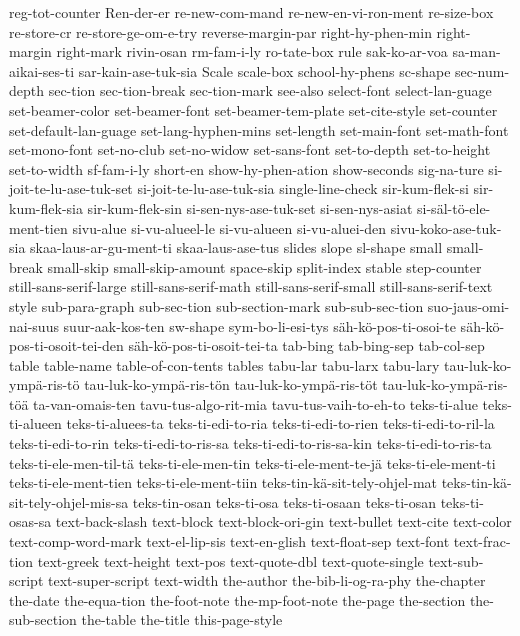 {reg-tot-counter
Ren-der-er
re-new-com-mand
re-new-en-vi-ron-ment
re-size-box
re-store-cr
re-store-ge-om-e-try
reverse-margin-par
right-hy-phen-min
right-margin
right-mark
rivin-osan
rm-fam-i-ly
ro-tate-box
rule
sak-ko-ar-voa
sa-man-aikai-ses-ti
sar-kain-ase-tuk-sia
Scale
scale-box
school-hy-phens
sc-shape
sec-num-depth
sec-tion
sec-tion-break
sec-tion-mark
see-also
select-font
select-lan-guage
set-beamer-color
set-beamer-font
set-beamer-tem-plate
set-cite-style
set-counter
set-default-lan-guage
set-lang-hyphen-mins
set-length
set-main-font
set-math-font
set-mono-font
set-no-club
set-no-widow
set-sans-font
set-to-depth
set-to-height
set-to-width
sf-fam-i-ly
short-en
show-hy-phen-ation
show-seconds
sig-na-ture
si-joit-te-lu-ase-tuk-set
si-joit-te-lu-ase-tuk-sia
single-line-check
sir-kum-flek-si
sir-kum-flek-sia
sir-kum-flek-sin
si-sen-nys-ase-tuk-set
si-sen-nys-asiat
si-säl-tö-ele-ment-tien
sivu-alue
si-vu-alueel-le
si-vu-alueen
si-vu-aluei-den
sivu-koko-ase-tuk-sia
skaa-laus-ar-gu-ment-ti
skaa-laus-ase-tus
slides
slope
sl-shape
small
small-break
small-skip
small-skip-amount
space-skip
split-index
stable
step-counter
still-sans-serif-large
still-sans-serif-math
still-sans-serif-small
still-sans-serif-text
style
sub-para-graph
sub-sec-tion
sub-section-mark
sub-sub-sec-tion
suo-jaus-omi-nai-suus
suur-aak-kos-ten
sw-shape
sym-bo-li-esi-tys
säh-kö-pos-ti-osoi-te
säh-kö-pos-ti-osoit-tei-den
säh-kö-pos-ti-osoit-tei-ta
tab-bing
tab-bing-sep
tab-col-sep
table
table-name
table-of-con-tents
tables
tabu-lar
tabu-larx
tabu-lary
tau-luk-ko-ympä-ris-tö
tau-luk-ko-ympä-ris-tön
tau-luk-ko-ympä-ris-töt
tau-luk-ko-ympä-ris-töä
ta-van-omais-ten
tavu-tus-algo-rit-mia
tavu-tus-vaih-to-eh-to
teks-ti-alue
teks-ti-alueen
teks-ti-aluees-ta
teks-ti-edi-to-ria
teks-ti-edi-to-rien
teks-ti-edi-to-ril-la
teks-ti-edi-to-rin
teks-ti-edi-to-ris-sa
teks-ti-edi-to-ris-sa-kin
teks-ti-edi-to-ris-ta
teks-ti-ele-men-til-tä
teks-ti-ele-men-tin
teks-ti-ele-ment-te-jä
teks-ti-ele-ment-ti
teks-ti-ele-ment-tien
teks-ti-ele-ment-tiin
teks-tin-kä-sit-tely-ohjel-mat
teks-tin-kä-sit-tely-ohjel-mis-sa
teks-tin-osan
teks-ti-osa
teks-ti-osaan
teks-ti-osan
teks-ti-osas-sa
text-back-slash
text-block
text-block-ori-gin
text-bullet
text-cite
text-color
text-comp-word-mark
text-el-lip-sis
text-en-glish
text-float-sep
text-font
text-frac-tion
text-greek
text-height
text-pos
text-quote-dbl
text-quote-single
text-sub-script
text-super-script
text-width
the-author
the-bib-li-og-ra-phy
the-chapter
the-date
the-equa-tion
the-foot-note
the-mp-foot-note
the-page
the-section
the-sub-section
the-table
the-title
this-page-style
}
